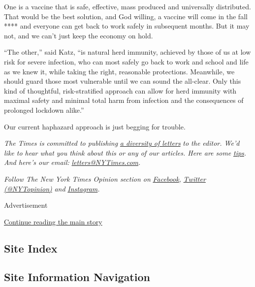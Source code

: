One is a vaccine that is safe, effective, mass produced and universally
distributed. That would be the best solution, and God willing, a vaccine
will come in the fall **** and everyone can get back to work safely in
subsequent months. But it may not, and we can't just keep the economy on
hold.

``The other,'' said Katz, ``is natural herd immunity, achieved by those
of us at low risk for severe infection, who can most safely go back to
work and school and life as we knew it, while taking the right,
reasonable protections. Meanwhile, we should guard those most vulnerable
until we can sound the all-clear. Only this kind of thoughtful,
risk-stratified approach can allow for herd immunity with maximal safety
and minimal total harm from infection and the consequences of prolonged
lockdown alike.''

Our current haphazard approach is just begging for trouble.

\emph{The Times is committed to publishing}
\href{https://www.nytimes3xbfgragh.onion/2019/01/31/opinion/letters/letters-to-editor-new-york-times-women.html}{\emph{a
diversity of letters}} \emph{to the editor. We'd like to hear what you
think about this or any of our articles. Here are some}
\href{https://help.nytimes3xbfgragh.onion/hc/en-us/articles/115014925288-How-to-submit-a-letter-to-the-editor}{\emph{tips}}\emph{.
And here's our email:}
\href{mailto:letters@NYTimes.com}{\emph{letters@NYTimes.com}}\emph{.}

\emph{Follow The New York Times Opinion section on}
\href{https://www.facebookcorewwwi.onion/nytopinion}{\emph{Facebook}}\emph{,}
\href{http://twitter.com/NYTOpinion}{\emph{Twitter (@NYTopinion)}}
\emph{and}
\href{https://www.instagram.com/nytopinion/}{\emph{Instagram}}\emph{.}

Advertisement

\protect\hyperlink{after-bottom}{Continue reading the main story}

\hypertarget{site-index}{%
\subsection{Site Index}\label{site-index}}

\hypertarget{site-information-navigation}{%
\subsection{Site Information
Navigation}\label{site-information-navigation}}

